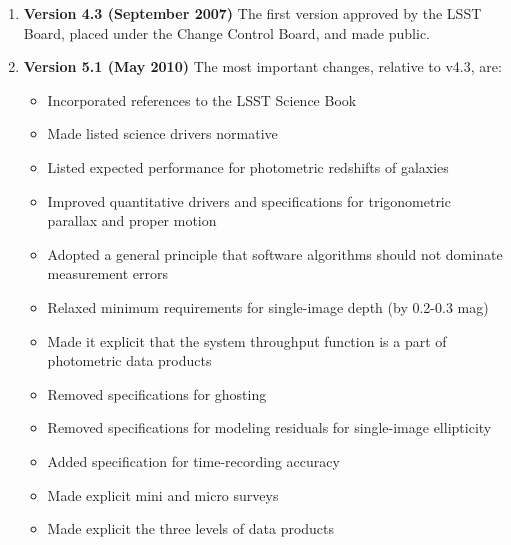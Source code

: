 \begin{enumerate}
\item {\bf Version 4.3 (September 2007)} The first version approved by the LSST Board, placed under the Change
 Control Board, and made public.

\item {\bf Version 5.1 (May 2010)} The most important changes, relative to v4.3, are:
\begin{itemize}
\item Incorporated references to the LSST Science Book
\item Made listed science drivers normative
\item Listed expected performance for photometric redshifts of galaxies
\item Improved quantitative drivers and specifications for trigonometric parallax and proper motion
\item Adopted a general principle that software algorithms should not dominate measurement errors
\item Relaxed minimum requirements for single-image depth (by 0.2-0.3 mag)
\item Made it explicit that the system throughput function is a part of photometric data products
\item Removed specifications for ghosting
\item Removed specifications for modeling residuals for single-image ellipticity
\item Added specification for time-recording accuracy
\item Made explicit mini and micro surveys
\item Made explicit the three levels of data products
\end{itemize}
\end{enumerate}
